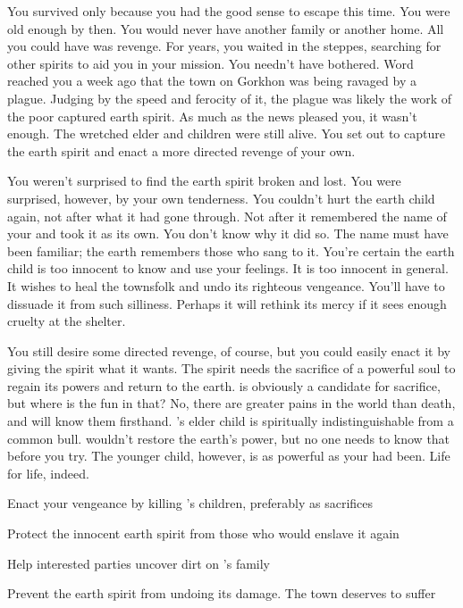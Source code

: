 \documentclass[char]{Pestilence}
\begin{document}
You survived only because you had the good sense to escape this time. You were old enough by then. You would never have another family or another home. All you could have was revenge. For years, you waited in the steppes, searching for other spirits to aid you in your mission. You needn't have bothered. Word reached you a week ago that the town on Gorkhon was being ravaged by a plague. Judging by the speed and ferocity of it, the plague was likely the work of the poor captured earth spirit. As much as the news pleased you, it wasn't enough. The wretched elder and \cElder{\their} children were still alive. You set out to capture the earth spirit and enact a more directed revenge of your own.

You weren't surprised to find the earth spirit broken and lost. You were surprised, however, by your own tenderness. You couldn't hurt the earth child again, not after what it had gone through. Not after it remembered the name of your \cPlaguebearer{\offspring} and took it as its own. You don't know why it did so. The name must have been familiar; the earth remembers those who sang to it. You're certain the earth child is too innocent to know and use your feelings. It is too innocent in general. It wishes to heal the townsfolk and undo its righteous vengeance. You'll have to dissuade it from such silliness. Perhaps it will rethink its mercy if it sees enough cruelty at the shelter.

You still desire some directed revenge, of course, but you could easily enact it by giving the spirit what it wants. The spirit needs the sacrifice of a powerful soul to regain its powers and return to the earth. \cElder{} is obviously a candidate for sacrifice, but where is the fun in that? No, there are greater pains in the world than death, and \cElder{} will know them firsthand. \cElder{}'s elder child is spiritually indistinguishable from a common bull. \cApprentice{\They} wouldn't restore the earth's power, but no one needs to know that before you try. The younger child, however, is as powerful as your \cPlaguebearer{} had been. Life for life, indeed.

\begin{itemz}[Goals]
	\item Enact your vengeance by killing \cElder{}'s children, preferably as sacrifices
	\item Protect the innocent earth spirit from those who would enslave it again
	\item Help interested parties uncover dirt on \cElder{}'s family
	\item Prevent the earth spirit from undoing its damage. The town deserves to suffer

\end{itemz}
\end{document}
